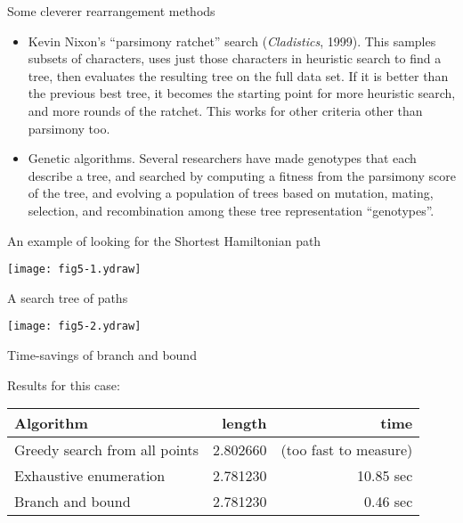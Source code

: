\documentclass[bluish,slideColor,colorBG,pdf]{prosper}
\begin{document}
\begin{slide}[Replace]{Some cleverer rearrangement methods}

\begin{itemize}
\item Kevin Nixon's ``parsimony ratchet'' search ({\it Cladistics}, 1999).
This samples subsets of characters, uses just those characters in heuristic
search to find a tree, then evaluates the resulting tree on the full data
set.  If it is better than the previous best tree, it becomes the starting
point for more heuristic search, and more rounds of the ratchet.  This
works for other criteria other than parsimony too.
\medskip

\item Genetic algorithms.  Several researchers have made genotypes that
each describe a tree, and searched by computing a fitness from the parsimony
score of the tree, and evolving a population of trees based on mutation,
mating, selection, and recombination among these tree representation
``genotypes''.
\end{itemize}

\end{slide}

\begin{slide}[Replace]{An example of looking for the Shortest Hamiltonian path}

\centerline{\texttt{[image: fig5-1.ydraw]}}

\end{slide}

\begin{slide}[Replace]{A search tree of paths}

\centerline{\texttt{[image: fig5-2.ydraw]}}

\end{slide}

\begin{slide}[Replace]{Time-savings of branch and bound}
\bigskip

Results for this case:
\bigskip

\renewcommand{\arraystretch}{1.4}
\begin{tabular}{l | r r}
Algorithm & length & time \\
\hline
Greedy search from all points & 2.802660  & (too fast to measure) \\
Exhaustive enumeration & 2.781230 & 10.85 sec \\
Branch and bound &  2.781230 & 0.46 sec
\end{tabular}


\end{slide}
\end{document}
